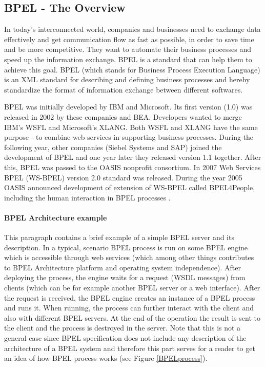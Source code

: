 \subsection{BPEL - The Overview} \label{BPEL}

In today's interconnected world, companies and businesses need to exchange data effectively and get communication flow as fast as possible, in order to save time and be more competitive. They want to automate their business processes and speed up the information exchange. BPEL is a standard that can help them to achieve this goal.
BPEL (which stands for Business Process Execution Language) is an XML standard for describing and defining business processes and hereby standardize the format of information exchange between different softwares. 

BPEL was initially developed by IBM and Microsoft. Its first version (1.0) was released in 2002 by these companies and BEA. Developers wanted to merge IBM's WSFL and Microsoft's XLANG. Both WSFL and XLANG have the same purpose - to combine web services in supporting business processes. During the following year, other companies (Siebel Systems and SAP) joined the development of BPEL and one year later they released version 1.1 together. After this, BPEL was passed to the OASIS nonprofit consortium. In 2007 Web Services BPEL (WS-BPEL) version 2.0 standard was released. During the year 2005 OASIS announced development of extension of WS-BPEL called BPEL4People, including the human interaction in BPEL processes \cite{BPELonWikipedia}.



\paragraph{BPEL Architecture example} \label{BPELarchitecture}
This paragraph contains a brief example of a simple BPEL server and its description. 
In a typical, scenario BPEL process is run on some BPEL engine which is accessible through web services (which among other things contributes to BPEL Architecture platform and operating system independence). After deploying the process, the engine waits for a request (WSDL messages) from clients (which can be for example another BPEL server or a web interface). After the request is received, the BPEL engine creates an instance of a BPEL process and runs it. When running, the process can further interact with the client and also with different BPEL servers. At the end of the operation the result is sent to the client and the process is destroyed in the server.
Note that this is not a general case since BPEL specification does not include any description of the architecture of a BPEL system and therefore this part serves for a reader to get an idea of how BPEL process works (see Figure \ref{BPELprocess}).  

